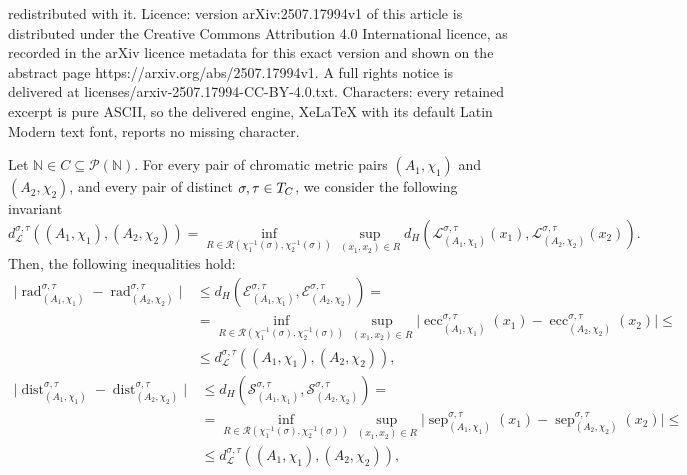 \documentclass[10pt,a4paper]{amsart}
\DeclareMathOperator{\dist}{dist}
\DeclareMathOperator{\ecc}{ecc}
\DeclareMathOperator{\rad}{rad}
\DeclareMathOperator{\sep}{sep}
\newcommand{\MP}[1]{(A_{#1},\chi_{#1})}
\newcommand{\N}{\mathbb{N}}
\newcommand{\Tau}{\mathcal T}
\begin{document}
redistributed with it. Licence: version arXiv:2507.17994v1 of this article is distributed under the Creative Commons Attribution 4.0 International licence, as recorded in the arXiv licence metadata for this exact version and shown on the abstract page https://arxiv.org/abs/2507.17994v1. A full rights notice is delivered at licenses/arxiv-2507.17994-CC-BY-4.0.txt. Characters: every retained excerpt is pure ASCII, so the delivered engine, XeLaTeX with its default Latin Modern text font, reports no missing character.
\begin{proposition}\label{prop:chromatic_invariants}
    Let $\N\in C\subseteq\mathcal P(\N)$. For every pair of chromatic metric pairs $\MP{1}$ and $\MP{2}$, and every pair of distinct $\sigma,\tau\in\mathcal \Tau_C$, we consider the following invariant
    \[
        d_{\mathcal{L}}^{\sigma,\tau}((A_1,\chi_1), (A_2, \chi_2))
        =
        \inf_{R\in\mathcal R(\chi_1^{-1}(\sigma),\chi_2^{-1}(\sigma))}\sup_{(x_1,x_2)\in R}d_H(\mathcal L_{\MP{1}}^{\sigma,\tau}(x_1),\mathcal L_{\MP{2}}^{\sigma,\tau}(x_2)).
    \]
    Then, the following inequalities hold:
    \begin{equation}
    \begin{aligned}
        \lvert\rad_{\MP{1}}^{\sigma,\tau}-\rad_{\MP{2}}^{\sigma,\tau}\rvert&\,
        \leq
        d_H(\mathcal E_{\MP{1}}^{\sigma,\tau},\mathcal E_{\MP{2}}^{\sigma,\tau})
        = \\
        &\,=
        \inf_{R\in\mathcal R(\chi_1^{-1}(\sigma),\chi_2^{-1}(\sigma))}\sup_{(x_1,x_2)\in R}\lvert\ecc_{\MP{1}}^{\sigma,\tau}(x_1)-\ecc_{\MP{2}}^{\sigma,\tau}(x_2)\rvert\leq \\
        &\,\leq
        d_{\mathcal{L}}^{\sigma,\tau}((A_1,\chi_1), (A_2, \chi_2)),
    \end{aligned}
    \end{equation}
    \begin{equation}
    \begin{aligned}
        \lvert\dist_{\MP{1}}^{\sigma,\tau}-\dist_{\MP{2}}^{\sigma,\tau}\rvert&\,
        \leq
        d_H(\mathcal S_{\MP{1}}^{\sigma,\tau},\mathcal S_{\MP{2}}^{\sigma,\tau})
        =\\
        &\,=
        \inf_{R\in\mathcal R(\chi_1^{-1}(\sigma),\chi_2^{-1}(\sigma))}\sup_{(x_1,x_2)\in R}\lvert\sep_{\MP{1}}^{\sigma,\tau}(x_1)-\sep_{\MP{2}}^{\sigma,\tau}(x_2)\rvert
        \leq \\
        &\,\leq
        d_{\mathcal{L}}^{\sigma,\tau}((A_1,\chi_1), (A_2, \chi_2)),
    \end{aligned}
    \end{equation}
    

\end{proposition}
\end{document}
